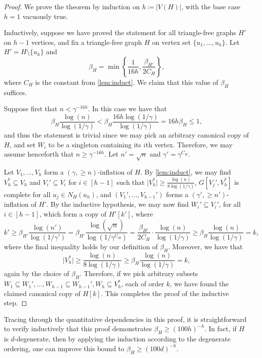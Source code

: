 \documentclass[11pt]{article}
\numberwithin{equation}{section}
\theoremstyle{plain}
\theoremstyle{remark}
\newcommand\ab[1]{\lvert #1 \rvert}
\begin{document}
\begin{proof}
    We prove the theorem by induction on $h\coloneqq\ab{V(H)}$, with the base case $h=1$ vacuously true.

    Inductively, suppose we have proved the statement for all triangle-free graphs $H'$ on $h-1$ vertices, and fix a triangle-free graph $H$ on vertex set $\{u_1,\dots,u_h\}$. Let $H' = H \setminus \{u_h\}$ and
    \[
    \beta_H = \min \left\{ \frac{1}{16h},  \frac{\beta_{H'}}{2C_H}\right\},
    \]
    where $C_H$ is the constant from \cref{lem:induct}.
    We claim that this value of $\beta_H$ suffices. 

    Suppose first that $n < \gamma^{-16h}$. In this case we have that
    \[
    \beta_H \frac{\log(n)}{\log(1/\gamma)} < \beta_H \frac{16h\log(1/\gamma)}{\log (1/\gamma)} =16h\beta_H \leq 1,
    \]
    and thus the statement is trivial since we may pick an arbitrary canonical copy of $H$, and set $W_i$ to be a singleton containing its $i$th vertex. Therefore, we may assume henceforth that $n \geq \gamma^{-16h}$. Let $n' = \sqrt n$ and $\gamma' = \gamma^{C_H}$.
    
    Let $V_1,\dots,V_h$ form a $(\gamma,\geq n)$-inflation of $H$. By \cref{lem:induct}, we may find $V_h^* \subseteq V_h$ and $V_i' \subseteq V_i$ for $i \in [h-1]$ such that $\ab{V_h^*} \geq  \frac{\log(n)}{8\log(1/\gamma)}$, $G[V_j', V_h^*]$ is complete for all $u_j \in N_H(u_h)$, and  $(V_1',\dots,V_{h-1}')$ forms a $(\gamma',\geq n')$-inflation of $H'$. By the inductive hypothesis, we may now find $W_i' \subseteq V_i'$, for all $i \in [h-1]$, which form a copy of $H'[k']$, where
    \[
    k' \geq \beta_{H'} \frac{\log(n')}{\log(1/\gamma')} = \beta_{H'} \frac{\log(\sqrt n)}{\log(1/\gamma^{C_H})} = \frac{\beta_{H'}}{2C_H} \cdot \frac{\log(n)}{\log(1/\gamma)} \geq \beta_H \frac{\log(n)}{\log(1/\gamma)}=k,
    \]
    where the final inequality holds by our definition of $\beta_H$. Moreover, we have that
    \[
    \ab{V_h^*} \geq  \frac{\log(n)}{8\log(1/\gamma)} \geq \beta_H \frac{\log(n)}{\log(1/\gamma)}=k,
    \]
    again by the choice of $\beta_H$. Therefore, if we pick arbitrary subsets $W_1 \subseteq W_1', \dots,W_{h-1} \subseteq W_{h-1}', W_h \subseteq V_h^*$, each of order $k$, we have found the claimed canonical copy of $H[k]$. This completes the proof of the inductive step.
\end{proof}
Tracing through the quantitative dependencies in this proof, it is straightforward to verify inductively that this proof demonstrates $\beta_H \geq (100 h)^{-h}$. In fact, if $H$ is $d$-degenerate, then by applying the induction according to the degenerate ordering, one can improve this bound to $\beta_H \geq (100d)^{-h}$.
\end{document}
